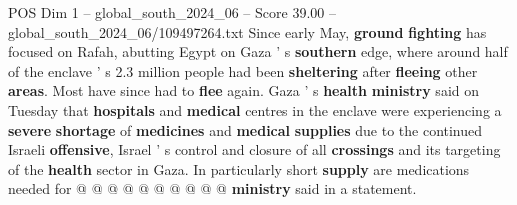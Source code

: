 \begin{textsample}{POS Dim 1 – global\_south\_2024\_06 – Score 39.00 – global\_south\_2024\_06/109497264.txt}
Since early May, \textbf{ground} \textbf{fighting} has focused on Rafah, abutting Egypt on Gaza ' s \textbf{southern} edge, where around half of the enclave ' s 2.3 million people had been \textbf{sheltering} after \textbf{fleeing} other \textbf{areas}.
Most have since had to \textbf{flee} again.
Gaza ' s \textbf{health} \textbf{ministry} said on Tuesday that \textbf{hospitals} and \textbf{medical} centres in the enclave were experiencing a \textbf{severe} \textbf{shortage} of \textbf{medicines} and \textbf{medical} \textbf{supplies} due to the continued Israeli \textbf{offensive}, Israel ' s control and closure of all \textbf{crossings} and its targeting of the \textbf{health} sector in Gaza.
In particularly short \textbf{supply} are medications needed for @ @ @ @ @ @ @ @ @ @ \textbf{ministry} said in a statement.

\end{textsample}
